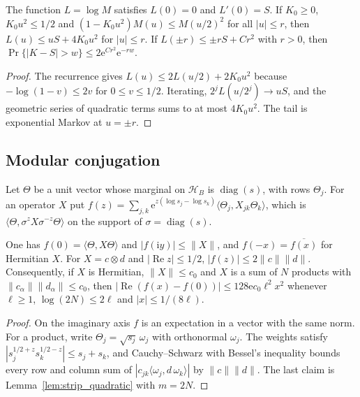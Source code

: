 \begin{lemma}
    \label{lem:surprisal_halving}
    \leanok
    The function $L=\log M$ satisfies $L(0)=0$ and $L'(0)=S$. If $K_0\ge0$,
    $K_0u^2\le1/2$ and $(1-K_0u^2)M(u)\le M(u/2)^2$ for all $|u|\le r$, then
    $L(u)\le uS+4K_0u^2$ for $|u|\le r$. If $L(\pm r)\le\pm rS+Cr^2$ with
    $r>0$, then $\Pr\{|K-S|>w\}\le2\mathrm e^{Cr^2}\mathrm e^{-rw}$.
\end{lemma}
\begin{proof}\leanok
    The recurrence gives $L(u)\le2L(u/2)+2K_0u^2$ because
    $-\log(1-v)\le2v$ for $0\le v\le1/2$. Iterating, $2^jL(u/2^j)\to uS$, and
    the geometric series of quadratic terms sums to at most
    $4K_0u^2$. The tail is exponential Markov at $u=\pm r$.
\end{proof}

\subsection{Modular conjugation}
\label{sec:marginal_tails_modular}

Let $\Theta$ be a unit vector whose marginal on $\mathcal H_B$ is
$\operatorname{diag}(s)$, with rows $\Theta_j$. For an operator $X$ put
$f(z)=\sum_{j,k}\mathrm e^{z(\log s_j-\log s_k)}\langle\Theta_j,X_{jk}\Theta_k\rangle$,
which is $\langle\Theta,\sigma^zX\sigma^{-z}\Theta\rangle$ on the support of
$\sigma=\operatorname{diag}(s)$.

\begin{lemma}
    \label{lem:modular_conjugation_quadratic}
    \leanok
    One has $f(0)=\langle\Theta,X\Theta\rangle$ and $|f(\mathrm iy)|\le\lVert X\rVert $,
    and $f(-x)=\overline{f(x)}$ for Hermitian $X$. For $X=c\otimes d$ and
    $|\operatorname{Re}z|\le1/2$, $|f(z)|\le2\lVert c\rVert \lVert d\rVert $. Consequently,
    if $X$ is Hermitian, $\lVert X\rVert \le c_0$ and $X$ is a sum of $N$ products
    with $\lVert c_\alpha\rVert\lVert d_\alpha\rVert\le c_0$, then
    $|\operatorname{Re}(f(x)-f(0))|\le128\mathrm ec_0\ell^2x^2$ whenever
    $\ell\ge1$, $\log(2N)\le2\ell$ and $|x|\le1/(8\ell)$.
\end{lemma}
\begin{proof}\leanok
    On the imaginary axis $f$ is an expectation in a vector with the same
    norm. For a product, write $\Theta_j=\sqrt{s_j}\,\omega_j$ with orthonormal
    $\omega_j$. The weights satisfy
    $|s_j^{1/2+z}s_k^{1/2-z}|\le s_j+s_k$, and Cauchy--Schwarz with Bessel's
    inequality bounds every row and column sum of
    $|c_{jk}\langle\omega_j,d\,\omega_k\rangle|$ by $\lVert c\rVert \lVert d\rVert $. The last
    claim is Lemma~\ref{lem:strip_quadratic} with $m=2N$.
\end{proof}

